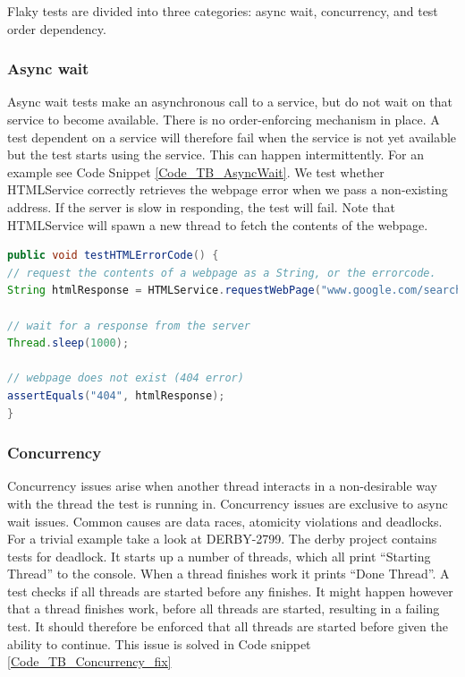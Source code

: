 \documentclass{uvamscse}
\begin{document}
Flaky tests are divided into three categories: async wait, concurrency, and test order dependency. 

\subsubsection{Async wait}
Async wait tests make an asynchronous call to a service, but do not wait on that service to become available. There is no order-enforcing mechanism in place. A test dependent on a service will therefore fail when the service is not yet available but the test starts using the service. This can happen intermittently. For an example see Code Snippet \ref{Code_TB_AsyncWait}. We test whether HTMLService correctly retrieves the webpage error when we pass a non-existing address. If the server is slow in responding, the test will fail. Note that HTMLService will spawn a new thread to fetch the contents of the webpage. 

\begin{lstlisting}[language=java, caption=Async wait TB, label=Code_TB_AsyncWait]
public void testHTMLErrorCode() {
// request the contents of a webpage as a String, or the errorcode.
String htmlResponse = HTMLService.requestWebPage("www.google.com/search/for/existence/of/life");

// wait for a response from the server
Thread.sleep(1000);

// webpage does not exist (404 error)
assertEquals("404", htmlResponse);
}
\end{lstlisting}

\subsubsection{Concurrency}
Concurrency issues arise when another thread interacts in a non-desirable way with the thread the test is running in. Concurrency issues are exclusive to async wait issues. Common causes are data races, atomicity violations and deadlocks. For a trivial example take a look at DERBY-2799. The derby project contains tests for deadlock. It starts up a number of threads, which all print ``Starting Thread'' to the console. When a thread finishes work it prints ``Done Thread''. A test checks if all threads are started before any finishes. It might happen however that a thread finishes work, before all threads are started, resulting in a failing test. It should therefore be enforced that all threads are started before given the ability to continue. This issue is solved in Code snippet \ref{Code_TB_Concurrency_fix}
\end{document}
